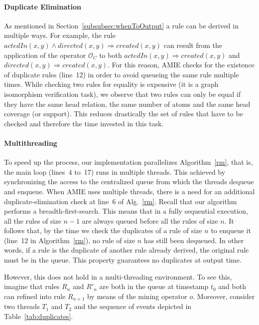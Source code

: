 \paragraph{Duplicate Elimination} \label{subsec:duplicateElimination}
As mentioned in Section~\ref{subsubsec:whenToOutput} a rule can be derived in multiple ways.
For example, the rule $actedIn(x,y) \wedge directed(x,y) \Rightarrow created(x,y)$ can result from the application
of the operator $\mathcal{O}_C$ to both $actedIn(x,y) \Rightarrow created(x,y)$ and $directed(x,y) \Rightarrow created(x,y)$.
For this reason, AMIE checks for the existence of duplicate rules (line~12) in order to avoid queueing the same rule multiple times.
While checking two rules for equality is expensive (it is a graph isomorphism verification task), 
we observe that two rules can only be equal if they have the same head relation, the same number of atoms and
the same head coverage (or support). This reduces drastically the set of rules that have to be checked and therefore
the time invested in this task.


\paragraph{Multithreading}
To speed up the process, our implementation parallelizes Algorithm~\ref{rm}, that is, the main loop (lines~4 to~17) runs in multiple threads. 
This achieved by synchronizing the access to the centralized queue from which the threads dequeue and enqueue.
When AMIE uses multiple threads, there is a need for an additional duplicate-elimination check at line~6 of Alg.~\ref{rm}.
Recall that our algorithm performs a breadth-first-search. 
This means that in a fully sequential execution, all the rules of size $n-1$ are always queued before all the rules of size $n$. 
It follows that, by the time we check the duplicates of a rule of size $n$ to enqueue it (line~12 in Algorithm~\ref{rm}), 
no rule of size $n$ has still been dequeued. In other words, if a rule is the duplicate 
of another rule already derived, the original rule must be in the queue. This property guarantees no duplicates at output time. 

However, this does not hold in a multi-threading environment. 
To see this, imagine that rules 
$R_n$ and $R'_n$ are both in the queue at timestamp $t_0$ and both can refined into rule $R_{n+1}$
by means of the mining operator $o$. 
Moreover, consider two threads $T_1$ and $T_2$ and the sequence of events depicted in Table~\ref{tab:duplicates}.

